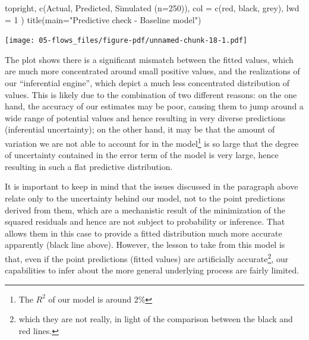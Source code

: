 \documentclass[
  letterpaper,
  DIV=11,
  numbers=noendperiod,
  oneside]{scrreprt}
\newenvironment{Shaded}{\begin{snugshade}}{\end{snugshade}}
\newcommand{\AttributeTok}[1]{\textcolor[rgb]{0.40,0.45,0.13}{#1}}
\newcommand{\DecValTok}[1]{\textcolor[rgb]{0.68,0.00,0.00}{#1}}
\newcommand{\FunctionTok}[1]{\textcolor[rgb]{0.28,0.35,0.67}{#1}}
\newcommand{\NormalTok}[1]{\textcolor[rgb]{0.00,0.23,0.31}{#1}}
\newcommand{\StringTok}[1]{\textcolor[rgb]{0.13,0.47,0.30}{#1}}
\begin{document}
\begin{Shaded}
\begin{Highlighting}[]
  \StringTok{\textquotesingle{}topright\textquotesingle{}}\NormalTok{, }
  \FunctionTok{c}\NormalTok{(}\StringTok{\textquotesingle{}Actual\textquotesingle{}}\NormalTok{, }\StringTok{\textquotesingle{}Predicted\textquotesingle{}}\NormalTok{, }\StringTok{\textquotesingle{}Simulated (n=250)\textquotesingle{}}\NormalTok{),}
  \AttributeTok{col =} \FunctionTok{c}\NormalTok{(}\StringTok{\textquotesingle{}red\textquotesingle{}}\NormalTok{, }\StringTok{\textquotesingle{}black\textquotesingle{}}\NormalTok{, }\StringTok{\textquotesingle{}grey\textquotesingle{}}\NormalTok{),}
  \AttributeTok{lwd =} \DecValTok{1}
\NormalTok{)}
\FunctionTok{title}\NormalTok{(}\AttributeTok{main=}\StringTok{"Predictive check {-} Baseline model"}\NormalTok{)}
\end{Highlighting}
\end{Shaded}

\texttt{[image: 05-flows\_files/figure-pdf/unnamed-chunk-18-1.pdf]}

The plot shows there is a significant mismatch between the fitted
values, which are much more concentrated around small positive values,
and the realizations of our ``inferential engine'', which depict a much
less concentrated distribution of values. This is likely due to the
combination of two different reasons: on the one hand, the accuracy of
our estimates may be poor, causing them to jump around a wide range of
potential values and hence resulting in very diverse predictions
(inferential uncertainty); on the other hand, it may be that the amount
of variation we are not able to account for in the model\footnote{The
  \(R^2\) of our model is around 2\%} is so large that the degree of
uncertainty contained in the error term of the model is very large,
hence resulting in such a flat predictive distribution.

It is important to keep in mind that the issues discussed in the
paragraph above relate only to the uncertainty behind our model, not to
the point predictions derived from them, which are a mechanistic result
of the minimization of the squared residuals and hence are not subject
to probability or inference. That allows them in this case to provide a
fitted distribution much more accurate apparently (black line above).
However, the lesson to take from this model is that, even if the point
predictions (fitted values) are artificially accurate\footnote{which
  they are not really, in light of the comparison between the black and
  red lines.}, our capabilities to infer about the more general
underlying process are fairly limited.
\end{document}
